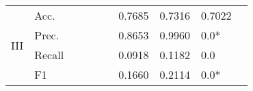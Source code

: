 \begin{tabular}{clllllllll}
    \midrule
    \multirow{4}{*}{III}              & Acc.                                                 &                         &                         &                              &                         & 0.7685                                                                       & 0.7316                                                                      & 0.7022                                    &                                           \\
                                      & Prec.                                                &                         &                         &                              &                         & 0.8653                                                                       & 0.9960                                                                      & 0.0*                                      &                                           \\
                                      & Recall                                               &                         &                         &                              &                         & 0.0918                                                                       & 0.1182                                                                      & 0.0                                       &                                           \\
                                      & F1                                                   &                         &                         &                              &                         & 0.1660                                                                       & 0.2114                                                                      & 0.0*                                      &                                           \\
    \bottomrule
    \end{tabular}